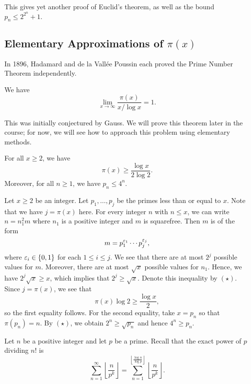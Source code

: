 This gives yet another proof of Euclid's theorem, as well as the bound $p_n \leq 2^{2^n} + 1$. 

\subsection{Elementary Approximations of $\pi(x)$}\label{subsec:1.2}
In 1896, Hadamard and de la Vall\'ee Poussin each proved the Prime Number Theorem independently. 

\begin{thm}\label{thm:1.11}
We have 
\[ \lim_{x\to\infty} \frac{\pi(x)}{x/\log x} = 1. \]
\end{thm}

This was initially conjectured by Gauss. We will prove this theorem later in the course; 
for now, we will see how to approach this problem using elementary methods. 

\begin{thm}\label{thm:1.12}
For all $x \geq 2$, we have 
\[ \pi(x) \geq \frac{\log x}{2\log 2}. \]
Moreover, for all $n \geq 1$, we have $p_n \leq 4^n$.
\end{thm}
\begin{pf}
Let $x \geq 2$ be an integer. Let $p_1, \dots, p_j$ be the primes less than or equal to $x$. 
Note that we have $j = \pi(x)$ here. For every integer $n$ with $n \leq x$, we can write $n = n_1^2m$
where $n_1$ is a positive integer and $m$ is squarefree. Then $m$ is of the form 
\[ m = p_1^{\varepsilon_1} \cdots p_j^{\varepsilon_j}, \]
where $\varepsilon_i \in \{0, 1\}$ for each $1 \leq i \leq j$. We see that there are at most $2^j$ possible 
values for $m$. Moreover, there are at most $\sqrt{x}$ possible values for $n_1$. Hence, we have 
$2^j \sqrt{x} \geq x$, which implies that $2^j \geq \sqrt{x}$. Denote this inequality by $(\star)$. 
Since $j = \pi(x)$, we see that 
\[ \pi(x) \log 2 \geq \frac{\log x}2, \]
so the first equality follows. For the second equality, take $x = p_n$ so that $\pi(p_n) = n$. 
By $(\star)$, we obtain $2^n \geq \sqrt{p_n}$ and hence $4^n \geq p_n$. 
\end{pf}

Let $n$ be a positive integer and let $p$ be a prime. Recall that the exact power of $p$ 
dividing $n!$ is 
\[ \sum_{n=1}^\infty \left\lfloor \frac{n}{p^k} \right\rfloor = \sum_{n=1}^{\left\lfloor \frac{\log n}{\log p} \right\rfloor} \left\lfloor \frac{n}{p^k} \right\rfloor. \]

